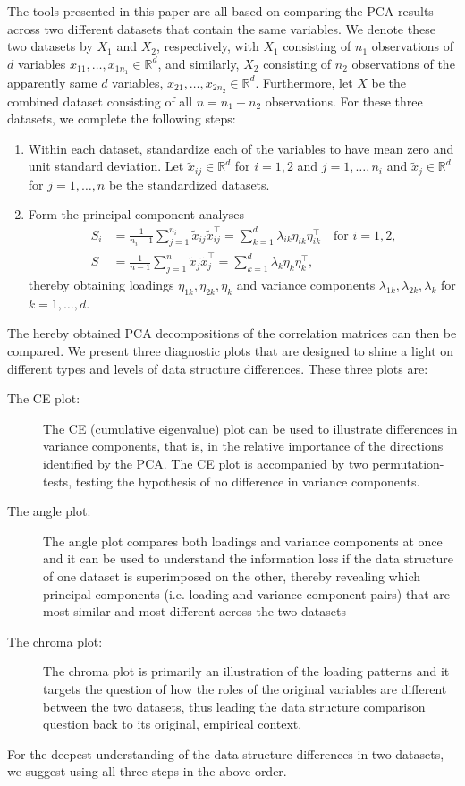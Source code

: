 \documentclass[a4paper,14pt]{article}
\newcommand{\RR}{\mathbb{R}}
\begin{document}
The tools presented in this paper are all based on comparing the PCA results across two different datasets that contain the same variables. We denote these two datasets by $X_1$ and $X_2$, respectively, with $X_1$ consisting of $n_1$ observations of $d$ variables $x_{11},\dotsc,x_{1 n_1} \in \RR^d$, and similarly, $X_2$ consisting of $n_2$ observations of the apparently same $d$ variables, $x_{21},\dotsc,x_{2 n_2} \in \RR^d$. %
Furthermore, let $X$ be the combined dataset consisting of all $n=n_1+n_2$ observations. For these %
three datasets, we complete the following steps:
\begin{enumerate}
\item Within each dataset, standardize each of the variables to have mean zero and unit standard deviation. Let $\tilde{x}_{ij} \in \RR^d$ for $i=1,2$ and $j=1,\dotsc,n_i$ and $\tilde{x}_j \in \RR^d$ for $j=1,\dotsc,n$ be the standardized datasets.
\item Form the principal component analyses
\begin{align*}
S_i &= \frac{1}{n_i-1} \sum_{j=1}^{n_i} \tilde{x}_{ij} \tilde{x}_{ij}^\top = \sum_{k=1}^d \lambda_{ik} \eta_{ik} \eta_{ik}^\top \quad \text{for $i=1,2$,} \\
S &= \frac{1}{n-1} \sum_{j=1}^n \tilde{x}_j \tilde{x}_j^\top = \sum_{k=1}^d \lambda_k \eta_k \eta_k^\top,
\end{align*}
thereby obtaining loadings $\eta_{1k}, \eta_{2k}, \eta_k$ and variance components $\lambda_{1k}, \lambda_{2k}, \lambda_k$ for $k=1,\dotsc,d$.
\end{enumerate}
The hereby obtained PCA decompositions of the correlation matrices can then be compared. We present three diagnostic plots that are designed to shine a light on different types and levels of data structure differences. These three plots are:
\begin{description}
\item[The CE plot:] The CE (cumulative eigenvalue) plot can be used to illustrate differences in variance components, that is, in the relative importance of the directions identified by the PCA. The CE plot is accompanied by two permutation-tests, testing the hypothesis of no difference in variance components.
\item[The angle plot:] The angle plot compares both loadings and variance components at once and it can be used to understand the information loss if the data structure of one dataset is superimposed on the other, thereby revealing which principal components (i.e. loading and variance component pairs) that are most similar and most different across the two datasets
\item[The chroma plot:] The chroma plot is primarily an illustration of the loading patterns and it targets the question of how the roles of the original variables are different between the two datasets, thus leading the data structure comparison question back to its original, empirical context.
\end{description}
For the deepest understanding of the data structure differences in two datasets, we suggest using all three steps in the above order.
\end{document}
